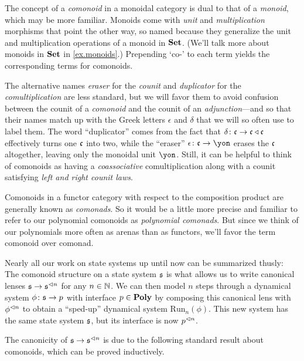 \documentclass[Book-Poly]{subfiles}
\begin{document}
\begin{remark}
The concept of a \emph{comonoid} in a monoidal category is dual to that of a \emph{monoid}, which may be more familiar.
Monoids come with \emph{unit} and \emph{multiplication} morphisms that point the other way, so named because they generalize the unit and multiplication operations of a monoid in $\mathbf{Set}$.
(We'll talk more about monoids in $\mathbf{Set}$ in \cref{ex.monoids}.)
Prepending `co-' to each term yields the corresponding terms for comonoids.

The alternative names \emph{eraser} for the \emph{counit} and \emph{duplicator} for the \emph{comultiplication} are less standard, but we will favor them to avoid confusion between the counit of a \emph{comonoid} and the counit of an \emph{adjunction}---and so that their names match up with the Greek letters $\epsilon$ and $\delta$ that we will so often use to label them.
The word ``duplicator'' comes from the fact that $\delta\colon\mathfrak{c}\to\mathfrak{c}\mathbin{\triangleleft}\mathfrak{c}$ effectively turns one $\mathfrak{c}$ into two, while the ``eraser'' $\epsilon\colon\ema{c}\to\yon$ erases the $\mathfrak{c}$ altogether, leaving only the monoidal unit $\yon$.
Still, it can be helpful to think of comonoids as having a \emph{coassociative} comultiplication along with a counit satisfying \emph{left and right counit laws}.
\end{remark}

\begin{remark}
Comonoids in a functor category with respect to the composition product are generally known as \emph{comonads}.
So it would be a little more precise and familiar to refer to our polynomial comonoids as \emph{polynomial comonads}.
But since we think of our polynomials more often as arenas than as functors, we’ll favor the term comonoid over comonad.
\end{remark}

\begin{example}
Nearly all our work on state systems up until now can be summarized thusly:
The comonoid structure on a state system $\mathfrak{s}$ is what allows us to write canonical lenses $\mathfrak{s}\to\mathfrak{s}^{\lhd n}$ for any $n\in\mathbb{N}$.
We can then model $n$ steps through a dynamical system $\phi\colon\mathfrak{s}\to p$ with interface $p\in\mathbf{Poly}$ by composing this canonical lens with $\phi^{\lhd n}$ to obtain a ``sped-up'' dynamical system $\text{Run}_n(\phi)$.
This new system has the same state system $\mathfrak{s}$, but its interface is now $p^{\lhd n}$.

The canonicity of $\mathfrak{s}\to\mathfrak{s}^{\lhd n}$ is due to the following standard result about comonoids, which can be proved inductively. %
\end{example}
\end{document}
